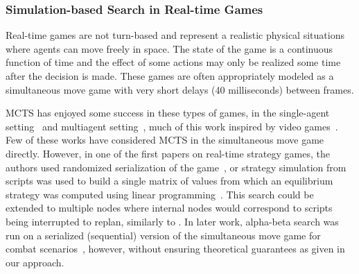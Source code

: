 
\subsubsection{Simulation-based Search in Real-time Games}


Real-time games are not turn-based and represent a realistic physical situations where agents can move freely in space. 
The state of the game is a continuous function of time and the effect of some actions may only be realized some time 
after the decision is made. These games are often appropriately modeled as a simultaneous move game with very short 
delays (40 milliseconds) between frames. 

MCTS has enjoyed some success in these types of games, in the single-agent 
setting~\cite{Pepels14Monte,Perez14PTSP} and multiagent setting~\cite{Balla09UCT}, much of this work inspired by video 
games~\cite{Cowling13Video,BellemareNVB13,Ontanon13RTSSurvey}. Few of these works have considered MCTS
in the simultaneous move game directly. 
However, in one of the first papers on real-time strategy games, the authors used randomized serialization 
of the game~\cite{kovarsky2005heuristic}, or strategy simulation
from scripts was used to build a single matrix of values from which an equilibrium strategy was 
computed using linear programming~\cite{Sailor07adversarial}.  
This search could be extended to multiple nodes where internal nodes would correspond to scripts being interrupted to replan, similarly to \cite{lisy2009gbgts}. 
In later work, alpha-beta search was run on a serialized (sequential) version of the 
simultaneous move game for combat scenarios~\cite{Churchill2012Fast}, however, without ensuring theoretical guarantees as given in our approach.





